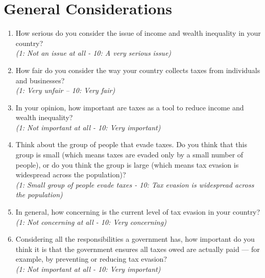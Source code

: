 \documentclass[11pt]{article}
\begin{document}
\section*{General Considerations}
\begin{enumerate}[resume]
    \item How serious do you consider the issue of income and wealth inequality in your country?\\
    \textit{(1: Not an issue at all - 10: A very serious issue)}
    \item How fair do you consider the way your country collects taxes from individuals and businesses?\\
    \textit{(1: Very unfair – 10: Very fair)}
    \item In your opinion, how important are taxes as a tool to reduce income and wealth inequality?\\
    \textit{(1: Not important at all - 10: Very important)}
    \item Think about the group of people that evade taxes. Do you think that this group is small (which means taxes are evaded only by a small number of people), or do you think the group is large (which means tax evasion is widespread across the population)?\\
    \textit{(1: Small group of people evade taxes - 10: Tax evasion is widespread across the population)}
    \item In general, how concerning is the current level of tax evasion in your country?\\
    \textit{(1: Not concerning at all - 10: Very concerning)}
    \item Considering all the responsibilities a government has, how important do you think it is that the government ensures all taxes owed are actually paid — for example, by preventing or reducing tax evasion?\\
    \textit{(1: Not important at all  - 10: Very important)}
\end{enumerate}
\end{document}
